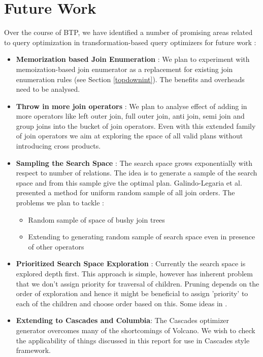 \chapter{Future Work}
Over the course of BTP, we have identified a number of promising areas related to query optimization in transformation-based query optimizers for future work :
\begin{itemize}
	\item \textbf{Memorization based Join Enumeration} : We plan to experiment with memoization-based join enumerator as a replacement for existing join enumeration rules (see Section \ref{topdownint}). The benefits and overheads need to be analysed.
	\item \textbf{Throw in more join operators} : We plan to analyse effect of adding in more operators like left outer join, full outer join, anti join, semi join and group joins into the bucket of join operators. Even with this extended family of join operators we aim at exploring the space of all valid plans without introducing cross products. 
	\item \textbf{Sampling the Search Space} : The search space grows exponentially with respect to number of relations. The idea is to generate a sample of the search space and from this sample give the optimal plan. Galindo-Legaria et al. \cite{galindo1995uniformly} presented a method for uniform random sample of all join orders. The problems we plan to tackle :
	\begin{itemize}
		\item Random sample of space of bushy join trees
		\item Extending to generating random sample of search space even in presence of other operators
	\end{itemize}
	\item \textbf{Prioritized Search Space Exploration} : Currently the search space is explored depth first. This approach is simple, however has inherent problem that we don't assign priority for traversal of children. Pruning depends on the order of exploration and hence it might be beneficial to assign 'priority' to each of the children and choose order based on this. Some ideas in \cite{fender2012effective}.	
	\item \textbf{Extending to Cascades and Columbia}: The Cascades optimizer generator overcomes many of the shortcomings of Volcano. We wish to check the applicability of things discussed in this report for use in Cascades style framework.	
\end{itemize}